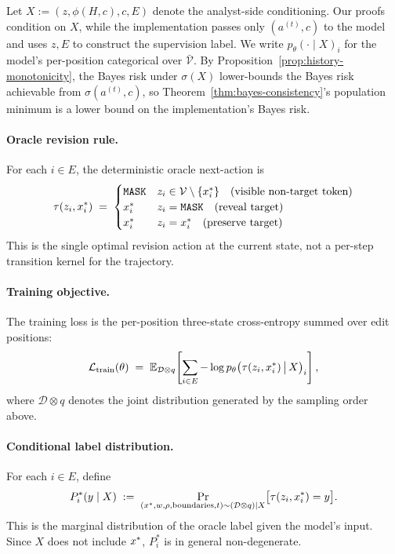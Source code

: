 Let $X := (z, \phi(H, c), c, E)$ denote the analyst-side conditioning. Our proofs condition on $X$, while the implementation passes only $(a^{(t)}, c)$ to the model and uses $z, E$ to construct the supervision label. We write $p_\theta(\cdot \mid X)_i$ for the model's per-position categorical over $\bar{\mathcal{V}}$. By Proposition~\ref{prop:history-monotonicity}, the Bayes risk under $\sigma(X)$ lower-bounds the Bayes risk achievable from $\sigma(a^{(t)}, c)$, so Theorem~\ref{thm:bayes-consistency}'s population minimum is a lower bound on the implementation's Bayes risk.

\paragraph{Oracle revision rule.}
For each $i \in E$, the deterministic oracle next-action is
\begin{equation}
\tau(z_i, x^{\ast}_i) \;=\; \begin{cases}
\texttt{MASK} & z_i \in \mathcal{V} \setminus \{x^{\ast}_i\} \quad \text{(visible non-target token)} \\
x^{\ast}_i & z_i = \texttt{MASK} \quad \text{(reveal target)} \\
x^{\ast}_i & z_i = x^{\ast}_i \quad \text{(preserve target)}
\end{cases}
\label{eq:oracle-tau}
\end{equation}
This is the single optimal revision action at the current state, not a per-step transition kernel for the trajectory.

\paragraph{Training objective.}
The training loss is the per-position three-state cross-entropy summed over edit positions:
\begin{equation}
\mathcal{L}_{\mathrm{train}}(\theta) \;=\; \mathbb{E}_{\mathcal{D} \otimes q}\!\left[\sum_{i \in E} -\log p_\theta\!\left(\tau(z_i, x^{\ast}_i) \,\big|\, X\right)_i\right],
\label{eq:rm-loss}
\end{equation}
where $\mathcal{D} \otimes q$ denotes the joint distribution generated by the sampling order above.

\paragraph{Conditional label distribution.}
For each $i \in E$, define
\begin{equation}
P^*_i(y \mid X) \;:=\; \Pr_{(x^{\ast}, w, \rho, \mathrm{boundaries}, t) \sim (\mathcal{D} \otimes q) \mid X}\!\big[\tau(z_i, x^{\ast}_i) = y\big].
\label{eq:Pstar-def}
\end{equation}
This is the marginal distribution of the oracle label given the model's input. Since $X$ does not include $x^{\ast}$, $P^*_i$ is in general non-degenerate.

